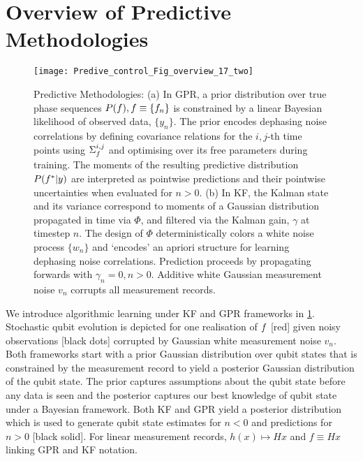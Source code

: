 \section{Overview of Predictive Methodologies \label{sec:main:OverviewofPredictive Methodologies}}
\begin{figure*}
    \texttt{[image: Predive\_control\_Fig\_overview\_17\_two]} 
    \caption{ \label{fig:main:Predive_control_Fig_overview_17_two} Predictive Methodologies: (a) In GPR, a prior  distribution over true phase sequences $P(f), f \equiv \{ f_n \}$ is constrained by a linear Bayesian likelihood of observed data, $\{ y_n\}$. The prior encodes dephasing noise correlations by defining covariance relations for the $i, j$-th time points using  $\Sigma_f^{i, j}$ and optimising over its free parameters during training. The moments of the resulting predictive distribution $P(f^*|y)$ are interpreted as pointwise predictions and their pointwise uncertainties when evaluated for $n>0$.  (b) In KF, the Kalman state and its variance correspond to moments of a Gaussian distribution propagated in time via $\Phi$, and filtered via the Kalman gain, $\gamma$ at timestep $n$. The design of $\Phi$ deterministically colors a white noise process $\{w_n \}$ and `encodes' an apriori structure for learning dephasing noise correlations. Prediction proceeds by propagating forwards with $\gamma_n=0, n>0$. Additive white Gaussian measurement noise $v_n$ corrupts all measurement records.}
\end{figure*}
We introduce algorithmic learning under KF and GPR frameworks in \cref{fig:main:Predive_control_Fig_overview_17_two}. Stochastic qubit evolution is depicted for one realisation of $f$ [red] given noisy observations [black dots] corrupted by Gaussian white measurement noise $v_n$.  Both frameworks start with a prior Gaussian distribution over qubit states that is constrained by the measurement record to yield a posterior Gaussian distribution of the qubit state. The prior captures assumptions about the qubit state before any data is seen and the posterior captures our best knowledge of qubit state under a Bayesian framework.  Both KF and GPR yield a posterior distribution which is used to generate qubit state estimates for $n<0$ and predictions for $n>0$ [black solid]. For linear measurement records, $h(x) \mapsto Hx$ and $f \equiv Hx$ linking GPR and KF notation. 
\\
